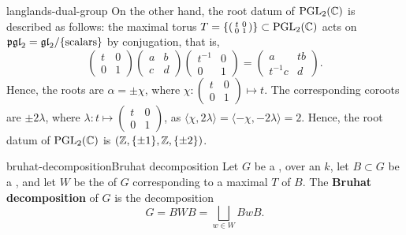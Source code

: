\begin{example}{langlands-dual-group}
    On the other hand, the root datum of $\textup{PGL}_2(\mathbb{C})$ is described as follows: the maximal torus $T = \left\{ \left( \begin{smallmatrix} t & 0 \\ 0 & 1 \end{smallmatrix} \right) \right\} \subset \textup{PGL}_2(\mathbb{C})$ acts on $\mathfrak{pgl}_2 = \mathfrak{gl}_2 / \{ \textup{scalars} \}$ by conjugation, that is,
    \[ \begin{pmatrix} t & 0 \\ 0 & 1 \end{pmatrix} \begin{pmatrix} a & b \\ c & d \end{pmatrix} \begin{pmatrix} t^{-1} & 0 \\ 0 & 1 \end{pmatrix} = \begin{pmatrix} a & t b \\ t^{-1} c & d \end{pmatrix} . \]
    Hence, the roots are $\alpha = \pm \chi$, where $\chi : \left( \begin{smallmatrix} t & 0 \\ 0 & 1 \end{smallmatrix} \right) \mapsto t$. The corresponding coroots are $\pm 2 \lambda$, where $\lambda : t \mapsto \left( \begin{smallmatrix} t & 0 \\ 0 & 1 \end{smallmatrix} \right)$, as $\langle \chi, 2 \lambda \rangle = \langle - \chi, - 2 \lambda \rangle = 2$. Hence, the root datum of $\textup{PGL}_2(\mathbb{C})$ is $(\mathbb{Z}, \{ \pm 1 \}, \mathbb{Z}, \{ \pm 2 \})$.
\end{example}

\begin{topic}{bruhat-decomposition}{Bruhat decomposition}
    Let $G$ be a ,   over an  $k$, let $B \subset G$ be a , and let $W$ be the  of $G$ corresponding to a maximal  $T$ of $B$. The \textbf{Bruhat decomposition} of $G$ is the decomposition
    \[ G = BWB = \bigsqcup_{w \in W} BwB . \]
\end{topic}

